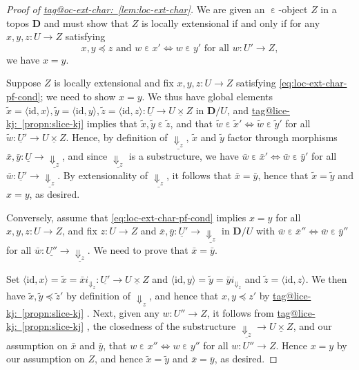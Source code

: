 \documentclass{amsart}
\makeatletter
\newcommand\AND{\text{ and }}
\newcommand\bD{\mathbf{D}}
\newcommand\br[1]{\langle{}#1\rangle{}}
\newcommand\Dwn{{\Downarrow}}
\newcommand\ein{\mathrel{\varepsilon}}
\newcommand\FORALL{\text{ for all }}
\newcommand\id{\mathrm{id}}
\newcommand\ToT{\Leftrightarrow}
\newcommand\und[1]{\underline{#1}}
\newcommand\unein{{\ein}}
\newcommand\tagword[1]{\csname tag@#1\endcsname}
\def\label@tag#1:#2\@nil{#1}
\newcommand\labeltag[1]{\label@tag#1:\@nil}
\newcommand\jref[1]{%
  \texorpdfstring%
    {\hyperref[#1]{\tagword{\labeltag{#1}}~\ref*{#1}}}%
    {\tagword{\labeltag{#1}}~\ref*{#1}}%
}
\theoremstyle{definition}
\theoremstyle{remark}
\theoremstyle{plainwithref}
\makeatother
\begin{document}
\begin{proof}[Proof of \jref{lem:loc-ext-char}] \label{proof:loc-ext-char}
  We are given an \( \unein \)-object \( Z \) in a topos \( \bD \) and must show that \( Z \) is locally extensional if and only if for any \( x,y,z \colon U \to Z \) satisfying
  \begin{equation*} \label{eq:loc-ext-char-pf-cond} \tag{\( \star \)}
    x,y \preceq z
    \AND
    w \ein x' \ToT w \ein y'
    \FORALL
    w \colon U' \to Z,
  \end{equation*}
  we have \( x = y \).

  Suppose \( Z \) is locally extensional and fix \( x,y,z \colon U \to Z \) satisfying \eqref{eq:loc-ext-char-pf-cond}; we need to show \( x = y \).
  We thus have global elements \( \tilde x = \br{\id, x}, \tilde y = \br{\id, y}, \tilde z = \br{\id,z} \colon \und U \to \und{U \times Z} \) in \( \bD / U \), and \jref{propn:slice-kj} implies that \( \tilde x, \tilde y \ein \tilde z \), and that \( \tilde w \ein \tilde x' \ToT \tilde w \ein \tilde y' \) for all \( \tilde w \colon \und U' \to \und{U \times Z} \).
  Hence, by definition of \( \und{\Dwn_z} \), \( \tilde x \) and \( \tilde y \) factor through morphisms \( \bar x, \bar y \colon \und U \to \und{\Dwn_z} \), and since \( \und{\Dwn_z} \) is a substructure, we have \( \bar w \ein \bar x' \ToT \bar w \ein \bar y' \) for all \( \bar w \colon \und U' \to \und{\Dwn_z} \).
  By extensionality of \( \und{\Dwn_z} \), it follows that \( \bar x = \bar y \), hence that \( \tilde x = \tilde y \) and \( x = y \), as desired.

  Conversely, assume that \eqref{eq:loc-ext-char-pf-cond} implies \( x = y \) for all \( x,y,z \colon U \to Z \), and fix \( z \colon U \to Z \) and \( \bar x, \bar y \colon \und U' \to \und{\Dwn_z} \) in \( \bD / U \) with \( \bar w \ein \bar x'' \ToT \bar w \ein \bar y'' \) for all \( \bar w \colon \und{U''} \to \und{\Dwn_z} \).
  We need to prove that \( \bar x = \bar y \).

  Set \( \br{\id, x} = \tilde x = \bar x i_{\Dwn_z} \colon \und{U'} \to \und{U \times Z} \) and \( \br{\id, y} = \tilde y = \bar y i_{\Dwn_z} \) and \( \tilde z = \br{\id, z} \).
  We then have \( \tilde x, \tilde y \preceq \tilde z' \) by definition of \( \Dwn_z \), and hence that \( x,y \preceq z' \) by \jref{propn:slice-kj}.
  Next, given any \( w \colon U'' \to Z \), it follows from \jref{propn:slice-kj}, the closedness of the substructure \( \und{\Dwn_z} \to \und{U \times Z} \), and our assumption on \( \bar x \) and \( \bar y \), that \( w \ein x'' \ToT w \ein y'' \) for all \( w \colon U'' \to Z \).
  Hence \( x = y \) by our assumption on \( Z \), and hence \( \tilde x = \tilde y \) and \( \bar x = \bar y \), as desired.
\end{proof}
\end{document}
